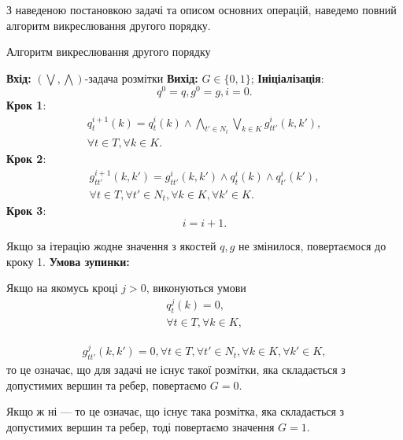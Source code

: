 З наведеною постановкою задачі та описом основних операцій, наведемо повний 
алгоритм викреслювання другого порядку.

\begin{algorithm}[H]
    \caption{Алгоритм викреслювання другого порядку}
    \begin{algorithmic}
    \State \textbf{Вхід:} $(\bigvee, \bigwedge)$-задача розмітки
    \State \textbf{Вихід:} $G\in\{0,1\}$;
    \State \textbf{Ініціалізація}: 
    \begin{equation*}
    q^0=q, g^0=g, i=0.
    \end{equation*}
    \State \textbf{Крок 1}: 
    \begin{equation*}
        \begin{aligned}
        q^{i+1}_t(k) = q^i_t(k)\wedge\bigwedge_{t'\in N_t}\bigvee_{k\in K}g^i_{tt'}(k,k'),\\
        \forall t\in T, \forall k\in K.
    \end{aligned}
    \end{equation*}
    \State \textbf{Крок 2}: 
    \begin{equation*}
        \begin{aligned}
        g^{i+1}_{tt'}(k,k') = g^i_{tt'}(k,k')\wedge q^i_t(k)\wedge q^i_{t'}(k'),\\
        \forall t\in T, \forall t'\in N_t,  \forall k\in K, \forall k'\in K.
    \end{aligned}
    \end{equation*}
    \State \textbf{Крок 3}: 
    \begin{equation*}
        i = i+1.
    \end{equation*}

Якщо за ітерацію жодне значення з якостей $q, g$ не змінилося, повертаємося до кроку 1.
\State \textbf{Умова зупинки:}

Якщо на якомусь кроці $j>0$, виконуються умови
\begin{equation*}
    \begin{aligned}
    q^{j}_t(k) = 0, \\
    \forall t\in T, \forall k\in K,
\end{aligned}
\end{equation*}

\begin{equation*}
    \begin{aligned}
g^{j}_{tt'}(k,k') = 0, 
\forall t\in T, \forall t'\in N_t,  \forall k\in K, \forall k'\in K,
\end{aligned}
\end{equation*}
то це означає, що для задачі не існує такої розмітки, яка складається
з допустимих вершин та ребер, повертаємо $G=0$.

Якщо ж ні --- то це означає, що існує така розмітка, яка складається
з допустимих вершин та ребер, тоді повертаємо значення $G=1$.
\end{algorithmic}
\end{algorithm}



